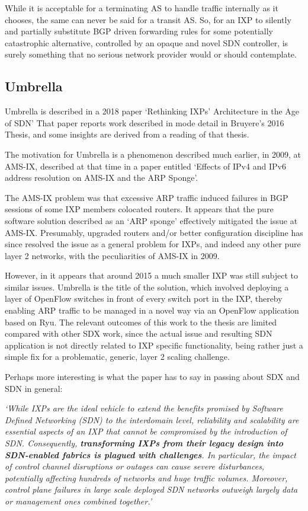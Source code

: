 While it is acceptable for a terminating AS to handle traffic internally as it chooses, the same can never be said for a transit AS.
So, for an IXP to silently and partially substitute BGP driven forwarding rules for some potentially catastrophic alternative, controlled by an opaque and novel SDN controller, is surely something that no serious network provider would or should contemplate.
\subsection{Umbrella}

Umbrella is described in a 2018 paper `Rethinking IXPs’ Architecture in the Age of SDN' \cite{Bruyere2018}
That paper reports work described in mode detail in Bruyere's 2016 Thesis\cite{Bruyere2016}, and some insights are derived from a reading of that thesis.

The motivation for Umbrella is a phenomenon described much earlier, in 2009, at AMS-IX, described at that time in a paper entitled `Effects of IPv4 and IPv6 address resolution on AMS-IX and the ARP Sponge'\cite{wessel2009}.

The AMS-IX problem was that excessive ARP traffic induced failures in BGP sessions of some IXP members colocated routers.  It appears that the pure software solution described as an `ARP sponge' effectively mitigated the issue at AMS-IX.  Presumably, upgraded routers and/or better configuration discipline has since resolved the issue as a general problem for IXPs, and indeed any other pure layer 2 networks, with the peculiarities of AMS-IX in 2009.

However, in \cite{Bruyere2018} it appears that around 2015 a much smaller IXP was still subject to similar issues.  Umbrella is the title of the solution, which involved deploying a layer of OpenFlow switches in front of every switch port in the IXP, thereby enabling ARP traffic to be managed in a novel way via an OpenFlow application based on Ryu.  The relevant outcomes of this work to the thesis are limited compared with other SDX work, since the actual issue and resulting SDN application is not directly related to IXP specific functionality, being rather just a simple fix for a problematic, generic, layer 2 scaling challenge.

Perhaps more interesting is what the paper has to say in passing about SDX and SDN in general:

\textit{`While IXPs are the ideal vehicle to extend the benefits promised by Software Defined Networking (SDN) to the interdomain level, reliability and scalability are essential aspects of an IXP that cannot be compromised by the introduction of SDN.
Consequently, \textbf{transforming IXPs from their legacy design into SDN-enabled fabrics is plagued with challenges}.
In particular, the impact of control channel disruptions or outages can cause severe disturbances, potentially affecting hundreds of networks and huge traffic volumes.
Moreover, control plane failures in large scale deployed SDN networks outweigh largely data or management ones combined together.'}


